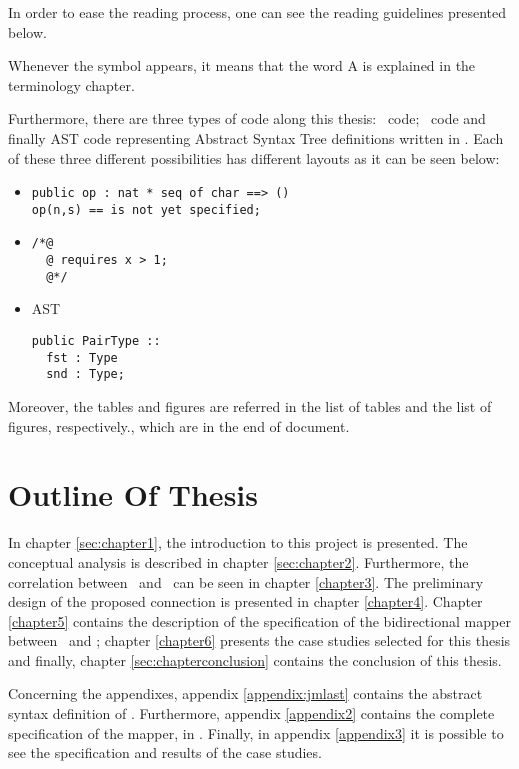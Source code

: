 In order to ease the reading process, one can see the reading guidelines presented below.

Whenever the symbol  appears, it means that the word A is explained in the terminology chapter.

Furthermore, there are three types of code along this thesis: \vpp\ code; \jml\ code and finally AST code representing Abstract Syntax Tree definitions written in \vdm. Each of these three different possibilities has different layouts as it can be seen below:
\begin{itemize}
\item \vpp
\lstset{language=VDM++}
\lstset{style=mystyle}
\begin{lstlisting}
public op : nat * seq of char ==> ()
op(n,s) == is not yet specified;
\end{lstlisting}
\item \jml
\lstset{language=Java}
\lstset{style=JML}
\begin{lstlisting}
/*@
  @ requires x > 1;
  @*/
\end{lstlisting}
\item AST
\lstset{language=VDM++}
\lstset{style=AST}
\begin{lstlisting}
public PairType ::
  fst : Type
  snd : Type;
\end{lstlisting}
\end{itemize}
\lstset{style=mystyle}

Moreover, the tables and figures are referred in the list of tables and the list of figures, respectively., which are in the end of document.

\section{Outline Of Thesis}
\label{sec:chapter1:outline}

In chapter \ref{sec:chapter1}, the introduction to this project is presented. The conceptual analysis is described in chapter \ref{sec:chapter2}. Furthermore, the correlation between \vpp\ and \jml\ can be seen in chapter \ref{chapter3}. The preliminary design of the proposed connection is presented in chapter \ref{chapter4}. Chapter \ref{chapter5} contains the description of the specification of the bidirectional mapper between \vpp\ and \jml; chapter \ref{chapter6} presents the case studies selected for this thesis and finally, chapter \ref{sec:chapterconclusion} contains the conclusion of this thesis.

Concerning the appendixes, appendix \ref{appendix:jmlast} contains the abstract syntax definition of \jml. Furthermore, appendix \ref{appendix2} contains the complete specification of the mapper, in \vpp. Finally, in appendix \ref{appendix3} it is possible to see the specification and results of the case studies.

